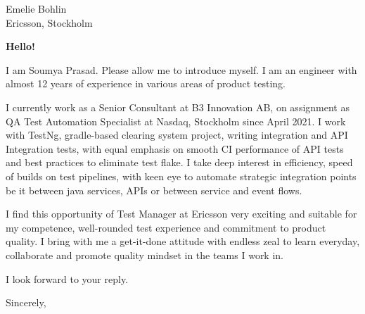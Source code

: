 \documentclass[10pt]{letter} %
\begin{document}

\begin{letter}{Emelie Bohlin \\ Ericsson, Stockholm} %


\opening{\textbf{Hello!}}
I am Soumya Prasad. Please allow me to introduce myself.  
I am an engineer with almost 12 years of experience in various
areas of product testing.

\hfill \break
I currently work as a Senior Consultant at B3 Innovation AB, on assignment as QA Test Automation Specialist at Nasdaq, Stockholm since April 2021. I work with TestNg, gradle-based 
clearing system project, writing integration and API Integration tests, with equal emphasis on smooth CI performance of API tests and best practices to eliminate test flake. I take deep interest in efficiency, speed of builds on test pipelines, with keen eye to automate strategic integration points be it between java services, APIs or between service and event flows.

\hfill \break
I find this opportunity of Test Manager at Ericsson very exciting and suitable for my competence, well-rounded test experience and commitment to product quality. I bring with me a get-it-done attitude with endless zeal to learn everyday, collaborate and promote quality mindset in the teams I work in.

I look forward to your reply.

\vspace{2\parskip} %
\closing{Sincerely,}
\vspace{2\parskip} %




\end{letter}
 
\end{document}
